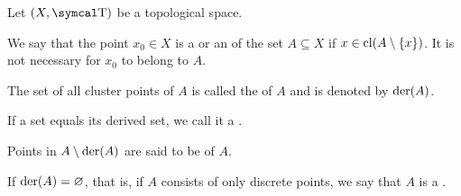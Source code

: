 \begin{definition}\label{def:topological_derived_set}
  Let \( (X, \CT) \) be a topological space.

  \begin{DefEnum}
     We say that the point \( x_0 \in X \) is a  or an  of the set \( A \subseteq X \) if \( x \in \operatorname{cl}(A \setminus \{ x \}) \). It is not necessary for \( x_0 \) to belong to \( A \).

     The set of all cluster points of \( A \) is called the  of \( A \) and is denoted by \( \operatorname{der}(A) \).

     If a set equals its derived set, we call it a .

     Points in \( A \setminus \operatorname{der}(A) \) are said to be  of \( A \).

     If \( \operatorname{der}(A) = \varnothing \), that is, if \( A \) consists of only discrete points, we say that \( A \) is a .
  \end{DefEnum}
\end{definition}

